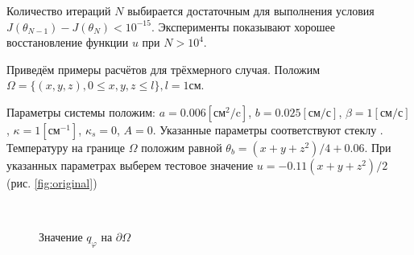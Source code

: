 \documentclass[10pt]{article}
\begin{document}
Количество итераций $N$ выбирается достаточным для выполнения условия $J(\theta_{N-1}) - J(\theta_N) < 10^{-15}$. Эксперименты показывают хорошее восстановление функции $u$ при $N > 10^4$.

Приведём примеры расчётов для трёхмерного случая. Положим $\Omega =\{(x,y,z), 0\leq x, y, z \leq l\}, l=1 \text{см}$.

Параметры системы положим: $a = 0.006[\text{см}^2/\text{c}]$, $b=0.025[\text{см}/\text{с}]$, $\beta = 1[\text{см}/\text{с}]$, $\kappa=1[\text{см}^{-1}]$, $\kappa_s = 0$, $A = 0$. Указанные параметры соответствуют стеклу \cite{grenkin_13}.
Температуру на границе $\Omega$ положим равной $\theta_b = (x+y+z^2)/4+0.06$.
При указанных параметрах выберем тестовое значение $u = -0.11(x + y +z^2)/2$ (рис. \ref{fig:original})

\begin{figure}[H]
	\label{fig:origial}
 \\
\caption{Значение $q_\varphi$ на $\partial \Omega$}
\end{figure}
\end{document}
